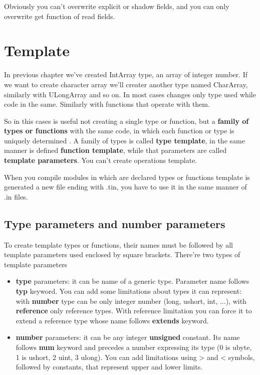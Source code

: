 \documentclass[10pt]{book}%
\renewcommand{\emph}[1]{\textbf{#1}}
\begin{document}
Obviously you can't overwrite explicit or shadow fields, and you can only overwrite get function of read fields.

\chapter{Template}
In previous chapter we've created IntArray type, an array of integer number. If we want to create character array we'll creater another type named CharArray, similarly with ULongArray and so on. In most cases changes only type used while code in the same. Similarly with functions that operate with them.

So in this cases is useful not creating a single type or function, but a \emph{family of types or functions} with the same code, in which each function or type is uniquely determined . A family of types is called \emph{type template}, in the same manner is defined \emph{function template}, while that parameters are called \emph{template parameters}. You can't create operations template.

When you compile modules in which are declared types or functions template is generated a new file ending with .tin, you have to use it in the same manner of .in files.

\section{Type parameters and number parameters}
To create template types or functions, their names must be followed by all template parameters used enclosed by square brackets. There're two types of template parameters
\begin{itemize}
\item \emph{type} parameters: it can be name of a generic type. Parameter name follows \emph{typ} keyword. You can add some limitations about types it can represent: with \emph{number} type can be only integer number (long, ushort, int, ...), with \emph{reference} only reference types. With reference limitation you can force it to extend a reference type whose name follows \emph{extends} keyword.
\item \emph{number} parameters: it can be any integer \emph{unsigned} constant. Its name follows \emph{num} keyword and precedes a number expressing its type (0 is ubyte, 1 is ushort, 2  uint, 3  ulong). You can add limitations using > and < symbols, followed by constants, that represent upper and lower limits.
\end{itemize}
\end{document}
